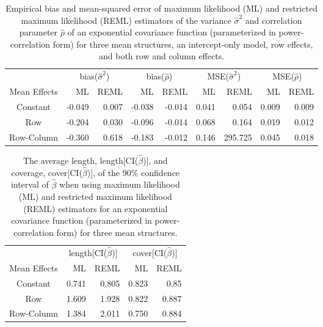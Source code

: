 \documentclass[12pt, titlepage]{article}
\begin{document}
\begin{table}[H] 
\caption{Empirical bias and mean-squared error of maximum likelihood (ML) and restricted maximum likelihood (REML) estimators of the variance $\hat{\sigma}^{2}$ and correlation parameter $\hat{\rho}$ of an exponential covariance function (parameterized in power-correlation form) for three mean structures, an intercept-only model, row effects, and both row and column effects. \label{tab:ML_REML_comp}}
\begin{center}
\begin{tabular}{crrrrrrrr}
  & \multicolumn{2}{c}{bias($\hat{\sigma}^{2}$)} & \multicolumn{2}{c}{bias($\hat{\rho}$)} & \multicolumn{2}{c}{MSE($\hat{\sigma}^{2}$)} & \multicolumn{2}{c}{MSE($\hat{\rho}$)}  \\
  Mean Effects & ML & REML & ML & REML & ML & REML & ML & REML  \\
	\hline
  \hline
Constant & -0.049 & 0.007 & -0.038 & -0.014 & 0.041 & 0.054 & 0.009 & 0.009 \\ 
Row &   -0.204 & 0.030 & -0.096 & -0.014 & 0.068 & 0.164 & 0.019 & 0.012 \\ 
Row-Column & -0.360 & 0.618 & -0.183 & -0.012 & 0.146 & 295.725 & 0.045 & 0.018 \\  \hline
  \hline
\end{tabular}
\end{center}
\end{table}

\begin{table}[H] 
\caption{The average length, length[CI($\hat{\beta}$)], and coverage, cover[CI($\hat{\beta}$)], of the 90\% confidence interval of $\hat{\beta}$ when using maximum likelihood (ML) and restricted maximum likelihood (REML) estimators  for an exponential covariance function (parameterized in power-correlation form) for three mean structures. \label{tab:ML_REML_comp}}
\begin{center}
\begin{tabular}{crrrr}
  & \multicolumn{2}{c}{length[CI($\hat{\beta}$)]}& \multicolumn{2}{c}{cover[CI($\hat{\beta}$)]} \\
  Mean Effects & ML & REML & ML & REML  \\
	\hline
  \hline
Constant & 0.741 & 0.805 & 0.823 & 0.85 \\ 
Row & 1.609 & 1.928 & 0.822 & 0.887 \\ 
Row-Column & 1.384 & 2.011 & 0.750 & 0.884 \\  \hline
  \hline
\end{tabular}
\end{center}
\end{table}
\end{document}
